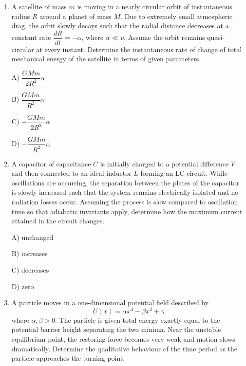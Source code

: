 \documentclass[12pt]{article}
\begin{document}
\begin{enumerate}
A) $\dfrac{P_0V_0}{n-1}\left(1-2^{1-n}\right)$

B) $P_0V_0\ln2$

C) $\dfrac{P_0V_0}{1-n}\left(2^{1-n}-1\right)$

D) $\dfrac{P_0V_0}{n}\left(2^{1-n}-1\right)$

\item

A satellite of mass $m$ is moving in a nearly circular orbit of instantaneous radius $R$ around a planet of mass $M$. 
Due to extremely small atmospheric drag, the orbit slowly decays such that the radial distance decreases at a constant rate $\dfrac{dR}{dt}=-\alpha$, where $\alpha \ll v$. 
Assume the orbit remains quasi-circular at every instant. 
Determine the instantaneous rate of change of total mechanical energy of the satellite in terms of given parameters.

A) $\dfrac{GMm}{2R^2}\alpha$

B) $\dfrac{GMm}{R^2}\alpha$

C) $-\dfrac{GMm}{2R^2}\alpha$

D) $-\dfrac{GMm}{R^2}\alpha$

\item

A capacitor of capacitance $C$ is initially charged to a potential difference $V$ and then connected to an ideal inductor $L$ forming an LC circuit. 
While oscillations are occurring, the separation between the plates of the capacitor is slowly increased such that the system remains electrically isolated and no radiation losses occur. 
Assuming the process is slow compared to oscillation time so that adiabatic invariants apply, determine how the maximum current attained in the circuit changes.

A) unchanged

B) increases

C) decreases

D) zero

\item

A particle moves in a one-dimensional potential field described by 
\[
U(x)=\alpha x^4 - \beta x^2 + \gamma
\]
where $\alpha,\beta>0$. The particle is given total energy exactly equal to the potential barrier height separating the two minima. 
Near the unstable equilibrium point, the restoring force becomes very weak and motion slows dramatically. 
Determine the qualitative behaviour of the time period as the particle approaches the turning point.


\end{enumerate}
\end{document}

